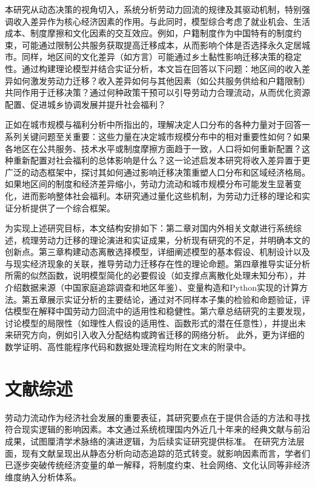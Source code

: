 \documentclass[master, final]{zufe-thesis}
\begin{document}
本研究从动态决策的视角切入，系统分析劳动力回流的规律及其驱动机制，特别强调收入差异作为核心经济因素的作用。与此同时，模型综合考虑了就业机会、生活成本、制度摩擦和文化因素的交互效应。例如，户籍制度作为中国特有的制度约束，可能通过限制公共服务获取提高迁移成本，从而影响个体是否选择永久定居城市。同样，地区间的文化差异（如方言）可能通过乡土黏性影响迁移决策的稳定性。通过构建理论模型并结合实证分析，本文旨在回答以下问题：地区间的收入差异如何激发劳动力迁移？收入差异如何与其他因素（如公共服务供给和户籍限制）共同作用于迁移决策？通过何种政策干预可以引导劳动力合理流动，从而优化资源配置、促进城乡协调发展并提升社会福利？

正如\textcite{desmetUrbanAccountingWelfare2013}在城市规模与福利分析中所指出的，理解决定人口分布的各种力量对于回答一系列关键问题至关重要：这些力量在决定城市规模分布中的相对重要性如何？如果各地区在公共服务、技术水平或制度摩擦方面趋于一致，人口将如何重新配置？这种重新配置对社会福利的总体影响是什么？这一论述启发本研究将收入差异置于更广泛的动态框架中，探讨其如何通过影响迁移决策重塑人口分布和区域经济格局。如果地区间的制度和经济差异缩小，劳动力流动和城市规模分布可能发生显著变化，进而影响整体社会福利。本研究通过量化这些机制，为劳动力迁移的理论和实证分析提供了一个综合框架。

为实现上述研究目标，本文结构安排如下：第二章对国内外相关文献进行系统综述，梳理劳动力迁移的理论演进和实证成果，分析现有研究的不足，并明确本文的创新点。第三章构建动态离散选择模型，详细阐述模型的基本假设、机制设计以及与现实经济现象的关联，推导劳动力迁移存在性的理论命题。第四章推导实证分析所需的似然函数，说明模型简化的必要假设（如支撑点离散化处理未知分布），并介绍数据来源（中国家庭追踪调查和地区年鉴）、变量构造和Python实现的计算方法。第五章展示实证分析的主要结论，通过对不同样本子集的检验和命题验证，评估模型在解释中国劳动力回流中的适用性和稳健性。第六章总结研究的主要发现，讨论模型的局限性（如理性人假设的适用性、函数形式的潜在任意性），并提出未来研究方向，例如引入收入分配结构或跨省迁移的网络分析。
此外，更为详细的数学证明、高性能程序代码和数据处理流程均附在文末的附录中。

\chapter{文献综述}

劳动力流动作为经济社会发展的重要表征，其研究要点在于提供合适的方法和寻找符合现实逻辑的影响因素。本文通过系统梳理国内外近几十年来的经典文献与前沿成果，试图厘清学术脉络的演进逻辑，为后续实证研究提供标准。
在研究方法层面，现有文献呈现出从静态分析向动态追踪的范式转变。就影响因素而言，学者们已逐步突破传统经济变量的单一解释，将制度约束、社会网络、文化认同等非经济维度纳入分析体系。
\end{document}
